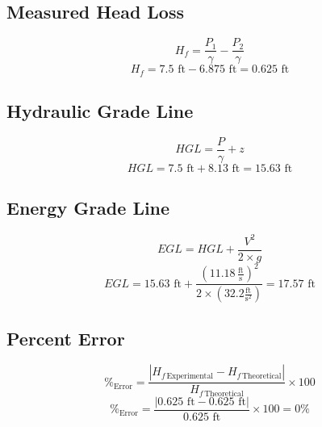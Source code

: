 \documentclass{article}
\begin{document}
\subsection{Measured Head Loss}
\[H_f=\frac{P_1}{\gamma}-\frac{P_2}{\gamma}\] 
\[H_f=7.5\text{ ft}-6.875\text{ ft}=\boxed{0.625\text{ ft}}\] 
\subsection{Hydraulic Grade Line}
\[HGL = \frac{P}{\gamma}+z\] 
\[HGL = 7.5\text{ ft}+8.13\text{ ft}=\boxed{15.63\text{ ft}}\]
\subsection{Energy Grade Line}
\[EGL = HGL +\frac{V^2}{2\times g}\] 
\[EGL = 15.63\text{ ft} + \frac{\left(11.18\,\frac{\text{ft}}{\text{s}}\right)^2}{2\times\left(32.2 \frac{\text{ft}}{\text{s}^2}\right)}=\boxed{17.57\text{ ft}}\]
\subsection{Percent Error} 
\[\%_\text{Error}=\frac{\left|H_{f\,\text{Experimental}}-H_{f\,\text{Theoretical}}\right|}{H_{f\,\text{Theoretical}}}\times 100\] 
\[\%_\text{Error}=\frac{|0.625\text{ ft}-0.625\text{ ft}|}{0.625\text{ ft}}\times 100=\boxed{0\%}\]
\newpage
\end{document}
